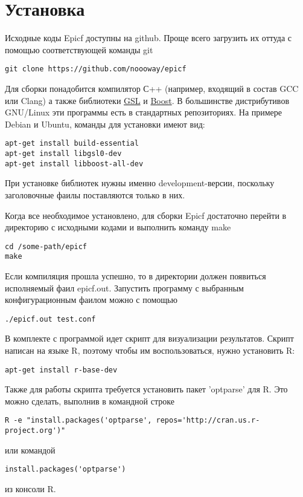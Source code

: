 \section{ Установка }
Исходные коды Epicf доступны на github. 
Проще всего загрузить их оттуда с помощью соответствующей команды git
\begin{verbatim}
git clone https://github.com/noooway/epicf
\end{verbatim}

Для сборки понадобится компилятор С++ (например, входящий в состав GCC или Clang)
а также библиотеки \href{http://www.gnu.org/software/gsl/}{GSL} и 
\href{http://www.boost.org/}{Boost}.
В большинстве дистрибутивов GNU/Linux эти программы есть в стандартных репозиториях.
На примере Debian и Ubuntu, команды для установки имеют вид:
\begin{verbatim}
apt-get install build-essential 
apt-get install libgsl0-dev
apt-get install libboost-all-dev
\end{verbatim}
При установке библиотек нужны именно development-версии,
поскольку заголовочные фаилы поставляются только в них.

Когда все необходимое установлено, для сборки Epicf достаточно 
перейти в директорию с исходными кодами и выполнить команду make
\begin{verbatim}
cd /some-path/epicf
make
\end{verbatim}

Если компиляция прошла успешно, то в директории должен появиться исполняемый фаил epicf.out.
Запустить программу с выбранным конфигурационным фаилом можно с помощью 
\begin{verbatim}
./epicf.out test.conf
\end{verbatim}

В комплекте с программой идет скрипт для визуализации результатов.
Скрипт написан на языке R, поэтому чтобы им воспользоваться, нужно установить R:
\begin{verbatim}
apt-get install r-base-dev
\end{verbatim}
Также для работы скрипта требуется установить пакет 'optparse' для R.
Это можно сделать, выполнив в командной строке
\begin{verbatim}
R -e "install.packages('optparse', repos='http://cran.us.r-project.org')"
\end{verbatim}
или командой
\begin{verbatim}
install.packages('optparse')
\end{verbatim}
из консоли R.

